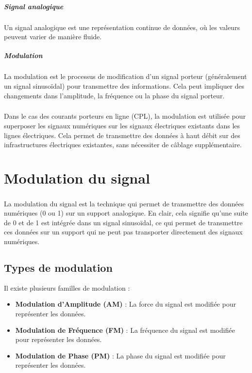 \documentclass[a4paper,twocolumn]{report}
\begin{document}
\paragraph{Signal analogique} Un signal analogique est une représentation continue de données,
où les valeurs peuvent varier de manière fluide.
\paragraph{Modulation} La modulation est le processus de modification d'un signal porteur
(généralement un signal sinusoïdal) pour transmettre des informations.
Cela peut impliquer des changements dans l'amplitude, la fréquence ou la phase du signal porteur.



\paragraph{}Dans le cas des courants porteurs en ligne (CPL), la modulation est utilisée
pour superposer les signaux numériques sur les signaux électriques existants dans les lignes électriques.
Cela permet de transmettre des données à haut débit sur des infrastructures électriques existantes,
sans nécessiter de câblage supplémentaire.
\chapter{Modulation du signal}

\paragraph{}La modulation du signal est la technique qui permet de transmettre
des données numériques (0 ou 1) sur un support analogique.
En clair, cela signifie qu'une suite de 0 et de 1 est intégrée dans un signal sinusoïdal,
ce qui permet de transmettre ces données sur un support qui ne peut pas transporter directement des signaux numériques.

\section{Types de modulation}
Il existe plusieurs familles de modulation :
\begin{itemize}
	\item \textbf{Modulation d'Amplitude (AM)} : La force du signal est modifiée pour représenter les données.
	\item \textbf{Modulation de Fréquence (FM)} : La fréquence du signal est modifiée pour représenter les données.
	\item \textbf{Modulation de Phase (PM)} : La phase du signal est modifiée pour représenter les données.
\end{itemize}
\end{document}
